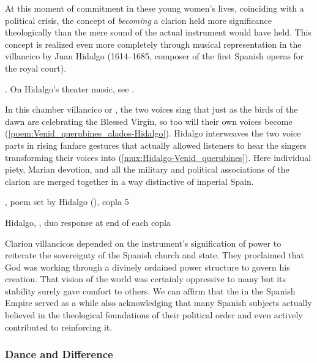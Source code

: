 At this moment of commitment in these young women's lives, coinciding with a
political crisis, the concept of \emph{becoming} a clarion held more
significance theologically than the mere sound of the actual instrument would
have held.
This concept is realized even more completely through musical representation in
the villancico  by Juan Hidalgo (1614--1685,
composer of the first Spanish operas for the royal court).%
\begin{Footnote}
    . 
    On Hidalgo's theater music, see \autocite{Stein:Songs}.
\end{Footnote}
In this chamber villancico or , the two voices sing that just
as the birds of the dawn are  celebrating the Blessed Virgin, so
too will their own voices become 
(\cref{poem:Venid_querubines_alados-Hidalgo}).
Hidalgo interweaves the two voice parts in rising fanfare gestures that
actually allowed listeners to hear the singers transforming their voices into
 (\cref{mux:Hidalgo-Venid_querubines}).
Here individual piety, Marian devotion, and all the military and political
associations of the clarion are merged together in a way distinctive of
imperial Spain.

{, poem set by Hidalgo (), copla 5}

{Hidalgo, , duo response at end of each copla}

Clarion villancicos depended on the instrument's signification of power to
reiterate the sovereignty of the Spanish church and state.
They proclaimed that God was working through a divinely ordained power
structure to govern his creation.
That vision of the world was certainly oppressive to many but its stability
surely gave comfort to others.
We can affirm that the  in the Spanish Empire served as
a  while also acknowledging that many Spanish
subjects actually believed in the theological foundations of their political
order and even actively contributed to reinforcing it.%
    \Autocites
    {Rodriguez:Villancico}
    {Sage:Instrumentum}

\subsubsection{Dance and Difference}

